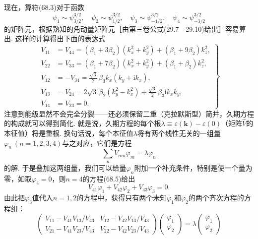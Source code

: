 现在，算符(68.3)对于函数
\begin{equation*}
\psi_1\sim\psi^{3/2}_{3/2},\quad
\psi_2\sim\psi^{3/2}_{1/2},\quad
\psi_3\sim\psi^{3/2}_{-1/2},\quad
\psi_4\sim\psi^{3/2}_{-3/2}
\end{equation*}
的矩阵元，根据熟知的角动量矩阵元［由第三卷公式(29.7—29.10)给出］容易算出. 这样的计算得出下面的表达式
\begin{equation}
\left.\begin{aligned}
V_{11}&=V_{44}=(\beta_1+3\beta_2)(k^2_x+k^2_y)+(\beta_1+9\beta_2)k^2_z,\\
V_{22}&=V_{33}=(\beta_1+7\beta_2)(k^2_x+k^2_y)+(\beta_1+\beta_2)k^2_z,\\
V_{12}&=-V_{34}=\frac{\sqrt{3}}{2}\,\beta_3k_x(k_y+\mathrm{i}k_x),\\
V_{13}&=V_{24}=2\sqrt{3}\,\beta_2(k^2_y-k^2_x)
+\frac{\sqrt{3}}{2}\,\beta_3\mathrm{i}k_xk_y,\\
V_{14}&=V_{23}=0.
\end{aligned}\right\}
\end{equation}
注意到能级显然不会完全分裂——还必须保留二重（克拉默斯型）简并，久期方程的构成就可以得到简化. 就是说，久期方程的每个根$\lambda\equiv\varepsilon(\bm{k})-\varepsilon(0)$（矩阵$\hat{V}$的本征值）将是重根. 换句话说，每个本征值$\lambda$将有两个线性无关的一组量$\varphi_n\ (n=1,2,3,4)$与之对应，它们是方程
\begin{equation}
\sum_nV_{nm}\varphi_m=\lambda\varphi_n
\end{equation}
的解. 于是叠加这两组量，我们可以给量$\varphi_n$附加一个补充条件，特别是使一个量为零，如取$\varphi_4=0$，则$n=4$的方程(68.5)给出
\begin{equation*}
V_{41}\varphi_1+V_{42}\varphi_2+V_{43}\varphi_3=0.
\end{equation*}
由此把$\varphi_3$值代入$n=1,2$的方程中，获得只有两个未知$\varphi_1$和$\varphi_2$的两个齐次方程的方程组：
\begin{equation*}
\begin{pmatrix}
V_{11}-V_{41}V_{13}/V_{43} & V_{12}-V_{42}V_{13}/V_{43}\\
V_{21}-V_{41}V_{23}/V_{43} & V_{22}-V_{42}V_{23}/V_{43}
\end{pmatrix}
\begin{pmatrix}\varphi_1\\ \varphi_2\end{pmatrix}
=\lambda\begin{pmatrix}\varphi_1\\ \varphi_2\end{pmatrix}
\end{equation*}
